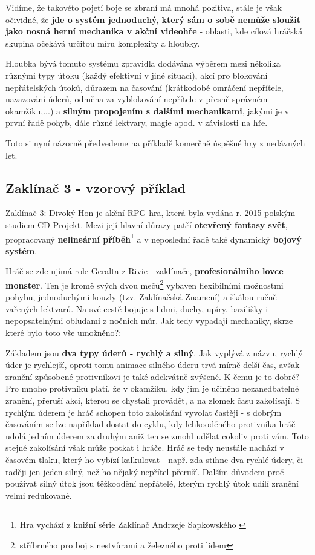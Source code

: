 Vidíme, že takovéto pojetí boje se zbraní má mnohá pozitiva, stále je však očividné, že \textbf{jde o systém jednoduchý, který sám o sobě nemůže sloužit jako nosná herní mechanika v akční videohře} - oblasti, kde cílová hráčská skupina očekává určitou míru komplexity a hloubky.

Hloubka bývá tomuto systému zpravidla dodávána výběrem mezi několika různými typy útoku (každý efektivní v jiné situaci), akcí pro blokování nepřátelských útoků, důrazem na časování (krátkodobé omráčení nepřítele, navazování úderů, odměna za vyblokování nepřítele v přesně správném okamžiku,...) a \textbf{silným propojením s dalšími mechanikami}, jakými je v první řadě pohyb, dále různé lektvary, magie apod. v závislosti na hře.

Toto si nyní názorně předvedeme na příkladě komerčně úspěšné hry z nedávných let.

\subsection{Zaklínač 3 - vzorový příklad}
Zaklínač 3: Divoký Hon \cite{Wiedzmin3} je akční \acs{RPG} hra, která byla vydána r. 2015 polským studiem CD Projekt. Mezi její hlavní důrazy patří \textbf{otevřený fantasy svět}, propracovaný \textbf{nelineární příběh}\footnote{Hra vychází z knižní série Zaklínač Andrzeje Sapkowského \cite{SapkowskiZaklinac}} a v neposlední řadě také dynamický \textbf{bojový systém}.

Hráč se zde ujímá role Geralta z Rivie - zaklínače, \textbf{profesionálního lovce monster}. Ten je kromě svých dvou mečů\footnote{stříbrného pro boj s nestvůrami a železného proti lidem} vybaven flexibilními možnostmi pohybu, jednoduchými kouzly (tzv. Zaklínačská Znamení) a škálou ručně vařených lektvarů. Na své cestě bojuje s lidmi, duchy, upíry, bazilišky i nepopsatelnými obludami z nočních můr.
Jak tedy vypadají mechaniky, skrze které bylo toto vše umožněno?:


Základem jsou \textbf{dva typy úderů - rychlý a silný}. Jak vyplývá z názvu, rychlý úder je rychlejší, oproti tomu animace silného úderu trvá mírně delší čas, avšak zranění způsobené protivníkovi je také adekvátně zvýšené. K čemu je to dobré? Pro mnoho protivníků platí, že v okamžiku, kdy jim je učiněno nezanedbatelné zranění, přeruší akci, kterou se chystali provádět, a na zlomek času zakolísají. S rychlým úderem je hráč schopen toto zakolísání vyvolat častěji - s dobrým časováním se lze například dostat do cyklu, kdy lehkooděného protivníka hráč udolá jedním úderem za druhým aniž ten se zmohl udělat cokoliv proti vám. Toto stejné zakolísání však může potkat i hráče. Hráč se tedy neustále nachází v časovém tlaku, který ho vybízí kalkulovat - např. zda stihne dva rychlé údery, či raději jen jeden silný, než ho nějaký nepřítel přeruší. Dalším důvodem proč používat silný útok jsou těžkoodění nepřátelé, kterým rychlý útok udílí zranění velmi redukované. 


